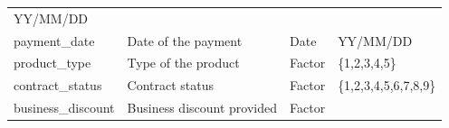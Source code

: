 \documentclass[
]{article}
\begin{document}
\begin{longtable}[]{@{}llll@{}}
\begin{minipage}[t]{0.19\columnwidth}
YY/MM/DD\strut
\end{minipage}\tabularnewline
\begin{minipage}[t]{0.30\columnwidth}\raggedright
payment\_date\strut
\end{minipage} & \begin{minipage}[t]{0.30\columnwidth}\raggedright
Date of the payment\strut
\end{minipage} & \begin{minipage}[t]{0.11\columnwidth}\raggedright
Date\strut
\end{minipage} & \begin{minipage}[t]{0.19\columnwidth}\raggedright
YY/MM/DD\strut
\end{minipage}\tabularnewline
\begin{minipage}[t]{0.30\columnwidth}\raggedright
product\_type\strut
\end{minipage} & \begin{minipage}[t]{0.30\columnwidth}\raggedright
Type of the product\strut
\end{minipage} & \begin{minipage}[t]{0.11\columnwidth}\raggedright
Factor\strut
\end{minipage} & \begin{minipage}[t]{0.19\columnwidth}\raggedright
\{1,2,3,4,5\}\strut
\end{minipage}\tabularnewline
\begin{minipage}[t]{0.30\columnwidth}\raggedright
contract\_status\strut
\end{minipage} & \begin{minipage}[t]{0.30\columnwidth}\raggedright
Contract status\strut
\end{minipage} & \begin{minipage}[t]{0.11\columnwidth}\raggedright
Factor\strut
\end{minipage} & \begin{minipage}[t]{0.19\columnwidth}\raggedright
\{1,2,3,4,5,6,7,8,9\}\strut
\end{minipage}\tabularnewline
\begin{minipage}[t]{0.30\columnwidth}\raggedright
business\_discount\strut
\end{minipage} & \begin{minipage}[t]{0.30\columnwidth}\raggedright
Business discount provided\strut
\end{minipage} & \begin{minipage}[t]{0.11\columnwidth}\raggedright
Factor\strut
\end{minipage} & \begin{minipage}[t]{0.19\columnwidth}\raggedright

\end{minipage}
\end{longtable}
\end{document}
